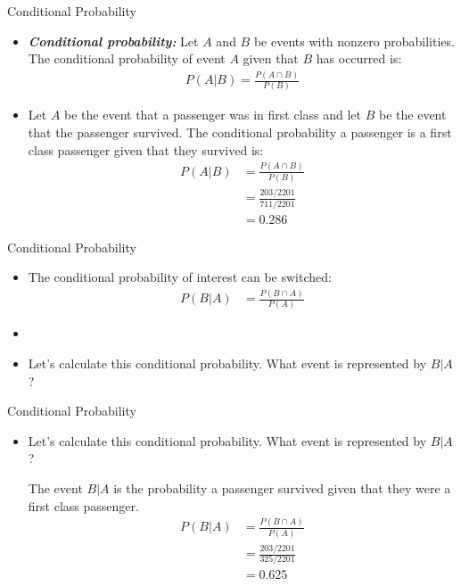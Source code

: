 \documentclass[xcolor=dvipsnames]{beamer}
\begin{document}
\begin{frame}{Conditional Probability}
	\begin{itemize}
		\item \textbf{\emph{Conditional probability:}} Let $A$ and $B$ be events with nonzero probabilities. The conditional probability of event $A$ given that $B$ has occurred is:
		\begin{gather*}
		P(A|B) = \frac{P(A \cap B)}{P(B)}
		\end{gather*} \pause
		\item Let $A$ be the event that a passenger was in first class and let $B$ be the event that the passenger survived. The conditional probability a passenger is a first class passenger given that they survived is: \pause
		\begin{align*}
		P(A|B) &= \frac{P(A \cap B)}{P(B)} \\
		&=\frac{203 / 2201}{711 / 2201}\\ 
		&= 0.286
		\end{align*}
	\end{itemize}
\end{frame}

\begin{frame}{Conditional Probability}
\begin{itemize}
	\item The conditional probability of interest can be switched: \pause
	\begin{align*}
	P(B|A) &= \frac{P(B \cap A)}{P(A)}
	\end{align*}
	\item[]\pause
	\item Let's calculate this conditional probability. What event is represented by $B|A$?
\end{itemize}
\end{frame}

\begin{frame}{Conditional Probability}
\begin{itemize}
	\item Let's calculate this conditional probability. What event is represented by $B|A$? \\ \pause
	
	The event $B|A$ is the probability a passenger survived given that they were a first class passenger.
	\begin{align*}
	P(B|A) &= \frac{P(B \cap A)}{P(A)} \\
	&= \frac{203 / 2201}{325 / 2201} \\
	&=  0.625
	\end{align*}
\end{itemize}
\end{frame}
\end{document}

